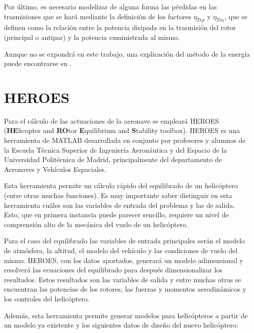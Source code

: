 Por último, es necesario modelizar de alguna forma las pérdidas en las trasmisiones que se hará mediante la definición de los factores $\eta_{Trp}$ y $\eta_{Tra}$, que se definen como la relación entre la potencia disipada en la trasmisión del rotor (principal o antipar) y la potencia suministrada al mismo.

Aunque no se expondrá en este trabajo, una explicación del método de la energía puede encontrarse en \citet{Cuerva}.

\section[\textbf{HE}licopter and \textbf{RO}tor \textbf{E}quilibrium and \textbf{S}tability toolbox]{HEROES}

Para el cálculo de las actuaciones de la aeronave se empleará HEROES (\textbf{HE}licopter and \textbf{RO}tor \textbf{E}quilibrium and \textbf{S}tability toolbox).
HEROES es una herramienta de MATLAB desarrollada en conjunto por profesores y alumnos de la Escuela Técnica Superior de Ingeniería Aeronáutica y del Espacio de la Universidad Politécnica de Madrid, principalmente del departamento de Aeronaves y Vehículos Espaciales.

Esta herramienta permite un cálculo rápido del equilibrado de un helicóptero (entre otras muchas funciones). Es muy importante saber distinguir en esta herramienta cuáles son las variables de entrada del problema y las de salida. Esto, que en primera instancia puede parecer sencillo, requiere un nivel de comprensión alto de la mecánica del vuelo de un helicóptero.

Para el caso del equilibrado las variables de entrada principales serán el modelo de atmósfera, la altitud, el modelo del vehículo y las condiciones de vuelo del mismo. HEROES, con los datos aportados, generará un modelo adimensional y resolverá las ecuaciones del equilibrado para después dimensionalizar los resultados. Estos resultados son las variables de salida y entre muchas otras se encuentran las potencias de los rotores, las fuerzas y momentos aerodinámicos y los controles del helicóptero.

Además, esta herramienta permite generar modelos para helicópteros a partir de un modelo ya existente y los siguientes datos de diseño del nuevo helicóptero:

